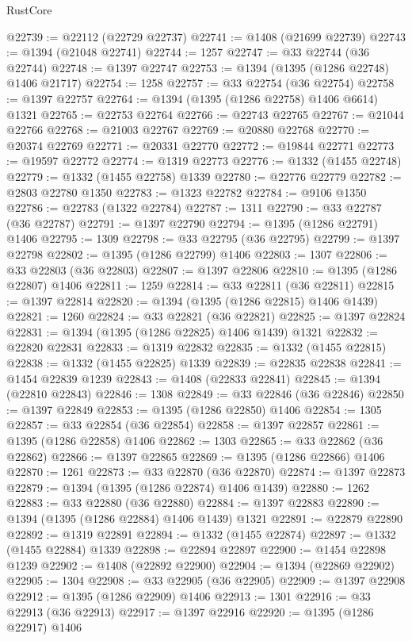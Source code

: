 \begin{lexlean}{RustCore}
\begin{coremodule}
@22739 := @22112 (@22729 @22737)
@22741 := @1408 (@21699 @22739)
@22743 := @1394 (@21048 @22741)
@22744 := 1257
@22747 := @33 @22744 (@36 @22744)
@22748 := @1397 @22747
@22753 := @1394 (@1395 (@1286 @22748) @1406 @21717)
@22754 := 1258
@22757 := @33 @22754 (@36 @22754)
@22758 := @1397 @22757
@22764 := @1394 (@1395 (@1286 @22758) @1406 @6614) @1321
@22765 := @22753 @22764
@22766 := @22743 @22765
@22767 := @21044 @22766
@22768 := @21003 @22767
@22769 := @20880 @22768
@22770 := @20374 @22769
@22771 := @20331 @22770
@22772 := @19844 @22771
@22773 := @19597 @22772
@22774 := @1319 @22773
@22776 := @1332 (@1455 @22748)
@22779 := @1332 (@1455 @22758) @1339
@22780 := @22776 @22779
@22782 := @2803 @22780 @1350
@22783 := @1323 @22782
@22784 := @9106 @1350
@22786 := @22783 (@1322 @22784)
@22787 := 1311
@22790 := @33 @22787 (@36 @22787)
@22791 := @1397 @22790
@22794 := @1395 (@1286 @22791) @1406
@22795 := 1309
@22798 := @33 @22795 (@36 @22795)
@22799 := @1397 @22798
@22802 := @1395 (@1286 @22799) @1406
@22803 := 1307
@22806 := @33 @22803 (@36 @22803)
@22807 := @1397 @22806
@22810 := @1395 (@1286 @22807) @1406
@22811 := 1259
@22814 := @33 @22811 (@36 @22811)
@22815 := @1397 @22814
@22820 := @1394 (@1395 (@1286 @22815) @1406 @1439)
@22821 := 1260
@22824 := @33 @22821 (@36 @22821)
@22825 := @1397 @22824
@22831 := @1394 (@1395 (@1286 @22825) @1406 @1439) @1321
@22832 := @22820 @22831
@22833 := @1319 @22832
@22835 := @1332 (@1455 @22815)
@22838 := @1332 (@1455 @22825) @1339
@22839 := @22835 @22838
@22841 := @1454 @22839 @1239
@22843 := @1408 (@22833 @22841)
@22845 := @1394 (@22810 @22843)
@22846 := 1308
@22849 := @33 @22846 (@36 @22846)
@22850 := @1397 @22849
@22853 := @1395 (@1286 @22850) @1406
@22854 := 1305
@22857 := @33 @22854 (@36 @22854)
@22858 := @1397 @22857
@22861 := @1395 (@1286 @22858) @1406
@22862 := 1303
@22865 := @33 @22862 (@36 @22862)
@22866 := @1397 @22865
@22869 := @1395 (@1286 @22866) @1406
@22870 := 1261
@22873 := @33 @22870 (@36 @22870)
@22874 := @1397 @22873
@22879 := @1394 (@1395 (@1286 @22874) @1406 @1439)
@22880 := 1262
@22883 := @33 @22880 (@36 @22880)
@22884 := @1397 @22883
@22890 := @1394 (@1395 (@1286 @22884) @1406 @1439) @1321
@22891 := @22879 @22890
@22892 := @1319 @22891
@22894 := @1332 (@1455 @22874)
@22897 := @1332 (@1455 @22884) @1339
@22898 := @22894 @22897
@22900 := @1454 @22898 @1239
@22902 := @1408 (@22892 @22900)
@22904 := @1394 (@22869 @22902)
@22905 := 1304
@22908 := @33 @22905 (@36 @22905)
@22909 := @1397 @22908
@22912 := @1395 (@1286 @22909) @1406
@22913 := 1301
@22916 := @33 @22913 (@36 @22913)
@22917 := @1397 @22916
@22920 := @1395 (@1286 @22917) @1406

\end{coremodule}
\end{lexlean}
